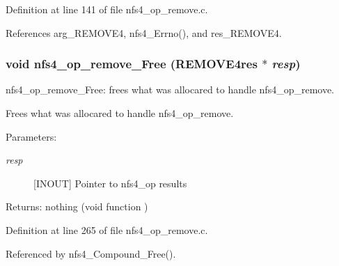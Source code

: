 Definition at line 141 of file nfs4\_\-op\_\-remove.c.

References arg\_\-REMOVE4, nfs4\_\-Errno(), and res\_\-REMOVE4.
\subsubsection{\setlength{\rightskip}{0pt plus 5cm}void nfs4\_\-op\_\-remove\_\-Free (REMOVE4res $\ast$ {\em resp})}\label{nfs4__op__remove_8c_a3}


nfs4\_\-op\_\-remove\_\-Free: frees what was allocared to handle nfs4\_\-op\_\-remove.

Frees what was allocared to handle nfs4\_\-op\_\-remove.

\begin{Desc}
\item[Parameters:]
\begin{description}
\item[{\em resp}][INOUT] Pointer to nfs4\_\-op results\end{description}
\end{Desc}
\begin{Desc}
\item[Returns:]nothing (void function ) \end{Desc}


Definition at line 265 of file nfs4\_\-op\_\-remove.c.

Referenced by nfs4\_\-Compound\_\-Free().